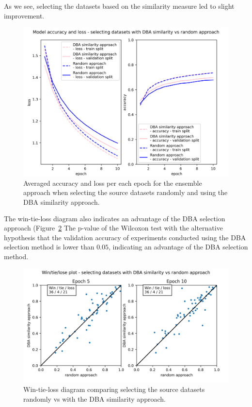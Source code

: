 \documentclass[a4paper,11pt,twoside]{report}
\theoremstyle{definition}
\begin{document}
As we see, selecting the datasets based on the similarity measure led to slight improvement.
\FloatBarrier
\begin{figure}[h!t]
\centering
\includegraphics[width=17cm]{imgs/dba_vs_random/loss_acc.png}
\caption{Averaged accuracy and loss per each epoch for the ensemble approach when selecting the source datasets randomly and using the DBA similarity approach.}
\label{fig:random_vs_dba}
\end{figure}
\FloatBarrier
The win-tie-loss diagram also indicates an advantage of the DBA selection approach (Figure~\ref{fig:random_vs_dba_win_tie_loss}
The p-value of the Wilcoxon test with the alternative hypothesis that the validation accuracy of experiments conducted using the DBA selection method is lower than $0.05$, indicating an advantage of the DBA selection method.
\FloatBarrier
\begin{figure}[h!t]
\centering
\includegraphics[width=17cm]{imgs/dba_vs_random/win_tie_lose_epoch.png}
\caption{Win-tie-loss diagram comparing selecting the source datasets randomly vs with the DBA similarity approach.}
\label{fig:random_vs_dba_win_tie_loss}
\end{figure}
\end{document}
